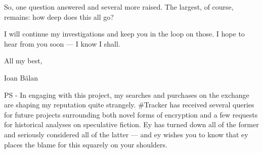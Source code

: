 So, one question answered and several more raised. The largest, of course, remains: how deep does this all go?

I will continue my investigations and keep you in the loop on those. I hope to hear from you soon — I know I shall.\pagebreak

All my best,

Ioan Bălan

PS - In engaging with this project, my searches and purchases on the exchange are shaping my reputation quite strangely. \#Tracker has received several queries for future projects surrounding both novel forms of encryption and a few requests for historical analyses on speculative fiction. Ey has turned down all of the former and seriously considered all of the latter — and ey wishes you to know that ey places the blame for this squarely on your shoulders.
